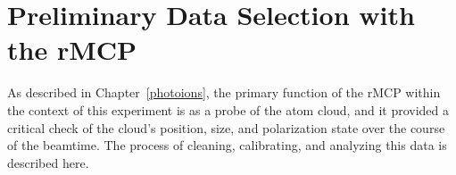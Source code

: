 

%



\section{Preliminary Data Selection with the rMCP}
\label{sec:rmcp_cuts}
As described in Chapter~\ref{photoions}, the primary function of the rMCP within the context of this experiment is as a probe of the atom cloud, and it provided a critical check of the cloud's position, size, and polarization state over the course of the beamtime.  The process of cleaning, calibrating, and analyzing this data is described here.  

